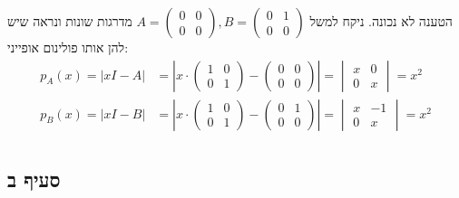 \documentclass{article}
\begin{document}
הטענה לא נכונה. ניקח למשל $A=\begin{pmatrix}
        0 & 0 \\
        0 & 0
    \end{pmatrix}, B=\begin{pmatrix}
        0 & 1 \\
        0 & 0
    \end{pmatrix}$ מדרגות שונות ונראה שיש להן אותו פולינום אופייני:
\begin{align*}
    p_A(x)=|xI-A| & =\left|x\cdot\begin{pmatrix}
        1 & 0 \\
        0 & 1
    \end{pmatrix} - \begin{pmatrix}
        0 & 0 \\
        0 & 0
    \end{pmatrix}\right|=
    \begin{vmatrix}
        x & 0 \\
        0 & x
    \end{vmatrix}=x^2                                                               \\
    p_B(x)=|xI-B| & =\left|x\cdot\begin{pmatrix}
        1 & 0 \\
        0 & 1
    \end{pmatrix} - \begin{pmatrix}
        0 & 1 \\
        0 & 0
    \end{pmatrix}\right|=
    \begin{vmatrix}
        x & -1 \\
        0 & x
    \end{vmatrix}=x^2                                                               \\
\end{align*}

\subsection*{סעיף ב}
\end{document}
